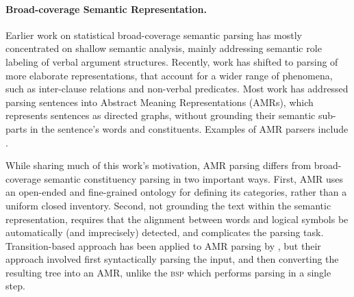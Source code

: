 \documentclass[11pt]{article}
\begin{document}
\paragraph{Broad-coverage Semantic Representation.}
Earlier work on statistical broad-coverage semantic parsing has mostly
concentrated on shallow semantic analysis, mainly addressing semantic
role labeling of verbal argument structures. 
Recently, work has shifted to parsing of more elaborate representations, that account
for a wider range of phenomena, such as inter-clause relations and non-verbal predicates.
Most work has addressed parsing sentences into Abstract Meaning Representations (AMRs),
which represents sentences as directed graphs, without
grounding their semantic sub-parts in the sentence's words and constituents.
Examples of AMR parsers include 
\cite{flanigan2014discriminative,vanderwende2015amr,pust2015parsing,artzi2015broad}. 

While sharing much of this work's motivation, AMR parsing differs from broad-coverage
semantic constituency parsing in two important ways.
First, AMR uses an open-ended and fine-grained ontology for defining its categories,
rather than a uniform closed inventory.
Second, not grounding the text within the semantic representation, 
requires that the alignment between words and logical symbols be automatically
(and imprecisely) detected, and complicates the parsing task.
Transition-based approach has been applied to AMR parsing by ,
but their approach involved first syntactically parsing the input, and then converting
the resulting tree into an AMR, unlike the \textsc{bsp} which performs parsing in a single step.
\end{document}
